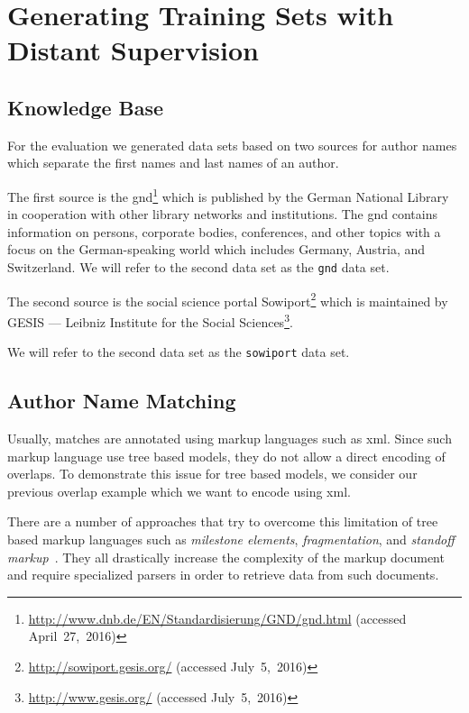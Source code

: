 \section{Generating Training Sets with Distant Supervision}\label{sec:i-distant-supervision}

\subsection{Knowledge Base}\label{sec:i-knowledge-base}


For the evaluation we generated data sets based on two sources for author names which separate the first names and last names of an author.

\bigskip

The first source is the \acrfull{gnd}\footnote{\url{http://www.dnb.de/EN/Standardisierung/GND/gnd.html} (accessed April~27,~2016)} which is published by the German National Library in cooperation with other library networks and institutions.
The \gls{gnd} contains information on persons, corporate bodies, conferences, and other topics with a focus on the German-speaking world which includes Germany, Austria, and Switzerland.
We will refer to the second data set as the \texttt{gnd} data set.

\bigskip

The second source is the social science portal Sowiport\footnote{\url{http://sowiport.gesis.org/} (accessed July~5,~2016)} which is maintained by GESIS --- Leibniz Institute for the Social Sciences\footnote{\url{http://www.gesis.org/} (accessed July~5,~2016)}.


We will refer to the second data set as the \texttt{sowiport} data set.


\subsection{Author Name Matching}\label{subsec:i-author-name-matching}
Usually, matches are annotated using markup languages such as \gls{xml}.
Since such markup language use tree based models, they do not allow a direct encoding of overlaps.
To demonstrate this issue for tree based models, we consider our previous overlap example which we want to encode using \gls{xml}\@{}.

There are a number of approaches that try to overcome this limitation of tree based markup languages such as \textit{milestone elements}, \textit{fragmentation}, and \textit{standoff markup}~\citep{sperberg2000goddag}. They all drastically increase the complexity of the markup document and require specialized parsers in order to retrieve data from such documents.

